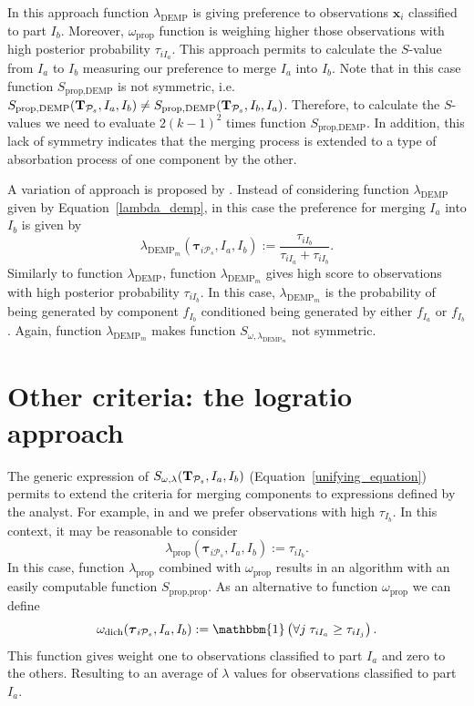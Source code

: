 \documentclass[submit]{smj}
\theoremstyle{definition}
\newcommand{\m}[1]{\boldsymbol{#1}}
\begin{document}
In this approach function $\lambda_{\text{DEMP}}$ is giving preference to observations $\m x_i$ classified to part $I_b$. Moreover, $\omega_{\text{prop}}$ function is weighing higher those observations with high posterior probability $\tau_{iI_a}$. This approach permits to calculate the $S$-value from $I_a$ to $I_b$ measuring our preference to merge $I_a$ into $I_b$. Note that in this case function  $S_{\text{prop}, \text{DEMP}}$ is not symmetric, i.e. $S_{\text{prop}, \text{DEMP}}(\text{\textbf{T}}_{\mathcal{P}_s},  I_a,  I_b) \neq S_{\text{prop}, \text{DEMP}}(\text{\textbf{T}}_{\mathcal{P}_s},  I_b,  I_a)$. Therefore, to calculate the $S$-values we need to evaluate $2 (k-1)^2$ times function $S_{\text{prop}, \text{DEMP}}$. In addition, this lack of symmetry indicates that the merging process is extended to a type of absorbation process of one component by the other.

A variation of \cite{hennig2010methods} approach is proposed by \cite{longford2014}. Instead of considering function $\lambda_{\text{DEMP}}$ given by Equation~\ref{lambda_demp}, in this case the preference for merging $I_a$ into $I_b$ is given by
\[
\lambda_{\text{DEMP}_m}(\m\tau_{i \mathcal{P}_s},  I_a,  I_b) := \frac{\tau_{iI_b}}{\tau_{iI_a} + \tau_{iI_b}}.
\] 
Similarly to function $\lambda_{\text{DEMP}}$, function $\lambda_{\text{DEMP}_m}$ gives high score to observations with high posterior probability $\tau_{iI_b}$. In this case, $\lambda_{\text{DEMP}_m}$ is the probability of being generated by component $f_{I_b}$ conditioned being generated by either $f_{I_a}$ or $f_{I_b}$. Again, function $\lambda_{\text{DEMP}_m}$ makes function $S_{\omega, \lambda_{\text{DEMP}_m}}$ not symmetric.


\section{Other criteria: the logratio approach}\label{logratio_section}


The generic expression of $S_{\omega, \lambda}(\text{\textbf{T}}_{\mathcal{P}_s},  I_a,  I_b)$ (Equation~\ref{unifying_equation}) permits to extend the criteria for merging components to expressions defined by the analyst. For example, in \cite{hennig2010methods} and \cite{longford2014} we prefer observations with high $\tau_{I_b}$. In this context, it may be reasonable to consider
\[
\lambda_{\text{prop}}(\m\tau_{i \mathcal{P}_s},  I_a,  I_b) := \tau_{iI_b}.
\]
In this case, function $\lambda_{\text{prop}}$ combined with $\omega_{\text{prop}}$ results in an algorithm with an easily computable function $S_{\text{prop}, \text{prop}}$. As an alternative to function $\omega_{\text{prop}}$ we can define 
\[
\omega_{\text{dich}}(\m\tau_{i \mathcal{P}_s},  I_a,  I_b) := \mathbbm{1}\left( \forall j\; \tau_{i I_{a}} \geq \tau_{iI_j} \right).
\]
This function gives weight one to observations classified to part $I_a$ and zero to the others. Resulting to an average of $\lambda$ values for observations classified to part $I_a$. 
\end{document}
